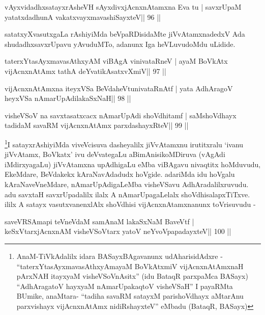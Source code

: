 \begin{shl}
vAyxvidadhxsatayxrAsheVH sAyxdivxjAcnxnAtamxna Eva tu |
savxrUpaM yatatxdadhunA vakatxvayxmavashiSayxteV\hfill || 96 ||
\end{shl}

\begin{artha}
satatxyXvasutxgaLa rAshiyiMda beVpaRDisidaMte jiVvAtamxnadedxV Ada
shudadhxsavxrUpavu yAvuduMTo, adanunx Iga heVLuvudoMdu uLidide.
\end{artha}

\begin{shl}
taterxYtasAyxmavasAthxyAM viBAgA vinivataRneV |
ayaM BoVkAtx vijAcnxnAtAmx tathA deYvatikAsatxvXmiV\hfill || 97 ||
\end{shl}

\begin{shl}
vijAcnxnAtAmxna iteyxVSa BeVdaheVtunivataRnAtf |
yata AdhAragoV heyxVSa nAmarUpAdilakaSxNaH\hfill || 98 ||
\end{shl}

\begin{shl}
visheVSoV na savxtasatxcacx nAmarUpAdi shoVdhitamf |
saMshoVdhayx tadidaM savaRM vijAcnxnAtAmx parxdashayxRteV\hfill || 99 ||
\end{shl}

\begin{artha}
\footnote{AnaM-TiVkAdalilx idara BASayxBAgavanunx udAharisidAdxre -
``taterxYtasAyxmavasAthxyAmayaM BoVkAtx\s miV vijAcnxnAtAmxnaH
  pArxNAH itayxyaM visheVSoVnAsitx'' (idu BataqR parxpaMca BASayx)
  ``AdhAragatoV hayxyaM nAmarUpakaqtoV visheVSaH'' I payaRMta BUmike,
  anaMtara- ``tadiha savaRM satayxM parishoVdhayx aMtarA\s nu
  parxvishayx vijAcnxnAtAmx nidiRshayxteV'' eMbadu (BataqR, BASayx)}I 
  satayxrAshiyiMda viveVcisuva dasheyalilx jiVvAtamxnu
irutitxralu `ivanu jiVvAtamx, BoVkatx' ivu deVvategaLu
aBimAnisikoMDiruva (vAgAdi iMdirxyagaLu) jiVvAtamxna upAdhigaLu eMba
viBAgavu nivaqtitx hoMduvudu, EkeMdare, BeVdakekx kAraNavAdadudx
hoVgide. adariMda idu hoVgalu kAraNaveVneMdare, nAmarUpAdigaLeMba
visheVSavu AdhAradalilxruvudu. adu savxtaH savxrUpadalilx ilalx A
nAmarUpagaLelalx shoVdhisalapxTiTxve. ililx A satayx vasutxvanenxlAlx
shoVdhisi vijAcnxnAtamxnanunx toVrisuvudu -
\end{artha}

\begin{shl}
saveVRSAmapi teVneVdaM samAnaM lakaSxNaM BaveVtf |
keSxVtarxjAcnxnAM visheVSoV\s tarx yatoV neYvoVpapadayxteV\hfill || 100 ||
\end{shl}


